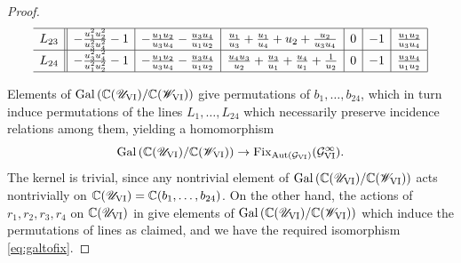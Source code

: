 \documentclass[a4paper,reqno]{amsart}
\numberwithin{equation}{section}
\newcommand{\C}{\mathbb{C}}
\newcommand{\pain}[1]{\operatorname{P}_{\mathrm{#1}}}
\numberwithin{equation}{section}
\begin{document}
\begin{proof}
\begin{table}[h]
\begin{equation*}
\begin{array}{c||c|c|c|c|c|c|}
        \hline
        L_{23}  & -\frac{u_1^2 u_2^2}{u_3^2 u_4^2}-1 & -\frac{u_1 u_2}{u_3 u_4}-\frac{u_3 u_4}{u_1 u_2} & \frac{u_1}{u_3}+\frac{u_1}{u_4}+u_2+\frac{u_2}{u_3 u_4}  & 0 & -1   & \frac{u_1 u_2}{u_3 u_4}          \\
        \hline
        L_{24}  & -\frac{u_3^2 u_4^2}{u_1^2 u_2^2}-1  & -\frac{u_1 u_2}{u_3 u_4}-\frac{u_3 u_4}{u_1 u_2} & \frac{u_4 u_3}{u_2}+\frac{u_3}{u_1}+\frac{u_4}{u_1}+\frac{1}{u_2} & 0 & -1   & \frac{u_3 u_4}{u_1 u_2}          \\
        \hline
    \end{array}
    \end{equation*}
    \caption{Pl\"ucker coordinates of lines $L_1,\dots,L_{24}$ on the monodromy surface for $\pain{VI}$}
    \label{tab:PVI:plucker:1to24}
\end{table}
\endgroup



Elements of $\operatorname{Gal}\left(\C(\mathscr{U}_{\rm{VI}})/\C(\mathscr{W}_{\rm{VI}})\right)$ give permutations of $b_1,\dots,b_{24}$, which in turn induce permutations of the lines $L_1,\dots,L_{24}$ which necessarily preserve incidence relations among them, yielding a homomorphism 
\begin{equation} \label{eq:galtofix}
\operatorname{Gal}\left(\C(\mathscr{U}_{\rm{VI}})/\C(\mathscr{W}_{\rm{VI}})\right)\rightarrow \operatorname{Fix}_{\operatorname{Aut}(\mathcal{G}_{\rm{VI}})}(\mathcal{G}_{\rm{VI}}^\infty).
\end{equation}
The kernel is trivial, since any nontrivial element of $\operatorname{Gal}\left(\C(\mathscr{U}_{\rm{VI}})/\C(\mathscr{W}_{\rm{VI}})\right)$ acts nontrivially on $\mathbb{C}(\mathscr{U}_{\rm{VI}})=\C(b_1,\dots,b_{24})$. 
On the other hand, the actions of $r_1,r_2,r_3,r_4$ on $\C(\mathscr{U}_{\rm{VI}})$ in  give elements of $\operatorname{Gal}\left(\C(\mathscr{U}_{\rm{VI}})/\C(\mathscr{W}_{\rm{VI}})\right)$
which induce the permutations of lines as claimed, and we have the required isomorphism \eqref{eq:galtofix}.
\end{proof}
\end{document}

